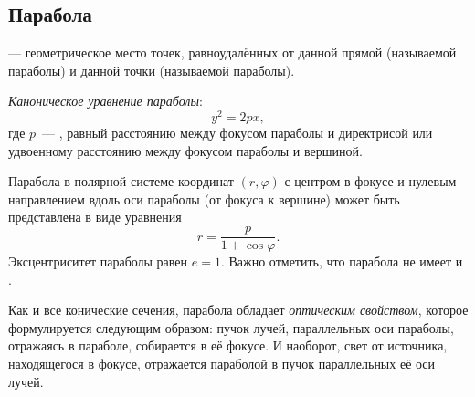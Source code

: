 \subsection{Парабола}
{\bfseries {}} --- геометрическое место точек, равноудалённых от данной прямой (называемой  параболы) и данной точки (называемой  параболы).

{\itshape Каноническое уравнение параболы}:
\begin{equation}
	y^2=2px,
\end{equation}
где $p$~--- , равный расстоянию между фокусом параболы и директрисой или удвоенному расстоянию между фокусом параболы и вершиной.

Парабола в полярной системе координат $(r,\varphi)$ с центром в фокусе и нулевым направлением вдоль оси параболы (от фокуса к вершине) может быть представлена в виде уравнения
\begin{equation}
	r = \frac{p}{1 + \cos\varphi}.
\end{equation}
Эксцентриситет параболы равен $e=1$. Важно отметить, что парабола не имеет  и .

Как и все конические сечения, парабола обладает \textit{оптическим свойством}, которое формулируется следующим образом: пучок лучей, параллельных оси параболы, отражаясь в параболе, собирается в её фокусе. И наоборот, свет от источника, находящегося в фокусе, отражается параболой в пучок параллельных её оси лучей.
